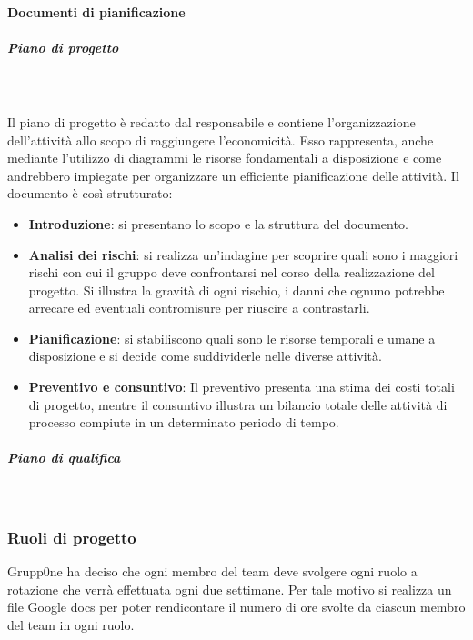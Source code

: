 \documentclass[../norme-di-progetto.tex]{subfiles}
\begin{document}
\paragraph{Documenti di pianificazione}
\label{par:documenti di pianificazione}
\subparagraph{Piano di progetto}\mbox{}\\
\label{subp:piano di progetto}
\\Il piano di progetto è redatto dal responsabile e contiene l'organizzazione dell'attività allo scopo di raggiungere l'economicità. Esso rappresenta, anche mediante l'utilizzo di diagrammi le risorse fondamentali a disposizione e come andrebbero impiegate per organizzare un efficiente pianificazione delle attività. Il documento è così strutturato:
\begin{itemize}
	\item \textbf{Introduzione}: si presentano lo scopo e la struttura del documento.
	\item \textbf{Analisi dei rischi}: si realizza un'indagine per scoprire quali sono i maggiori rischi con cui il gruppo deve confrontarsi nel corso della realizzazione del progetto. Si illustra la gravità di ogni rischio, i danni che ognuno potrebbe arrecare ed eventuali contromisure per riuscire a contrastarli.
	\item \textbf{Pianificazione}: si stabiliscono quali sono le risorse temporali e umane a disposizione e si decide come suddividerle nelle diverse attività.
	\item \textbf{Preventivo e consuntivo}: Il preventivo presenta una stima dei costi totali di progetto, mentre il consuntivo illustra un bilancio totale delle attività di processo compiute in un determinato periodo di tempo.
\end{itemize}
\subparagraph{Piano di qualifica}\mbox{}\\
\label{subp:piano di qualifica}
\subsubsection{Ruoli di progetto}
\label{subs:ruoli di progetto}
Grupp0ne ha deciso che ogni membro del team deve svolgere ogni ruolo a rotazione che verrà effettuata ogni due settimane. Per tale motivo si realizza un file Google docs per poter rendicontare il numero di ore svolte da ciascun membro del team in ogni ruolo.
\end{document}
